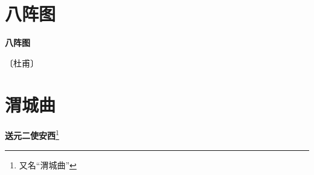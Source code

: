 \documentclass[12pt,UTF-8,openany,fontset=none]{ctexbook}
\begin{document}
\vspace{8pt}
\clearpage


\section{八阵图}



\begin{center}
    {\bfseries 八阵图}
\end{center}

\begin{center}
    \vspace{10pt}
    
    \begin{large}
        
        〔杜甫〕
        
    \end{large}
    
    \vspace{8pt}
    
    \begin{huge}
        
        \phantom{。}

        \phantom{。}
        
        \phantom{。}

        \phantom{。}
        
    \end{huge}
    
\end{center}

\vspace{8pt}
\clearpage


\section{渭城曲}



\begin{center}
    {\bfseries 送元二使安西}\footnote{又名“渭城曲”}
\end{center}
\end{document}
